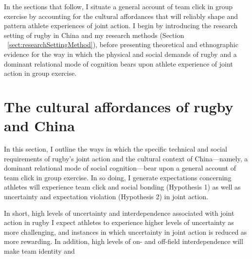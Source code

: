 \begin{CJK}{UTF8}{gbsn}
In the sections that follow, I situate a general account of team click in group exercise by accounting for the cultural affordances that will reliably shape and pattern athlete experiences of joint action.  I begin by introducing the research setting of rugby in China and my research methods (Section ~\ref{sect:researchSettingMethod}), before presenting theoretical and ethnographic evidence for the way in which the physical and social demands of rugby and a dominant relational mode of cognition bears upon athlete experience of joint action in group exercise.










\section{The cultural affordances of rugby and China}


In this section, I outline the ways in which the specific technical and social requirements of rugby's joint action and the cultural context of China---namely, a dominant relational mode of social cognition---bear upon a general account of team click in group exercise.  In so doing, I generate expectations concerning athletes will experience team click and social bonding (Hypothesis 1) as well as uncertainty and expectation violation (Hypothesis 2) in joint action.

In short, high levels of uncertainty and interdependence associated with joint action in rugby I expect athletes to experience higher levels of uncertainty as more challenging, and instances in which uncertainty in joint action is reduced as more rewarding.  In addition, high levels of on- and off-field interdependence will make team identity and


\end{CJK}
